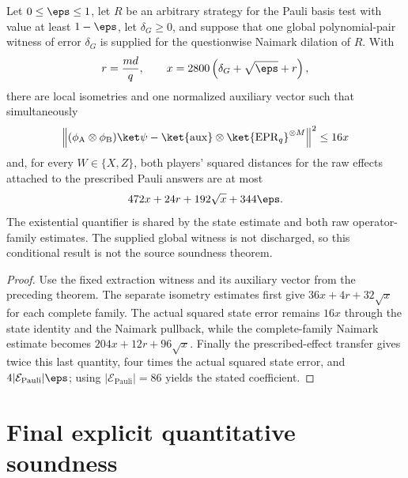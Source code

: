 \begin{theorem}
\label{thm:pauli-supplied-global-component-transfer-explicit}
\leanok
{}
Let $0\leq\eps\leq1$, let $R$ be an arbitrary strategy for the Pauli basis
test with value at least $1-\eps$, let $\delta_G\geq0$, and suppose that one
global polynomial-pair witness of error $\delta_G$ is supplied for the
questionwise Naimark dilation of $R$.  With
\[
 r=\frac{md}{q},
 \qquad
 x=2800\left(\delta_G+\sqrt\eps+r\right),
\]
there are local isometries and one normalized auxiliary vector such that
simultaneously
\[
 \left\|(\phi_{\mathrm A}\otimes\phi_{\mathrm B})\ket\psi
   -\ket{\mathrm{aux}}\otimes\ket{\mathrm{EPR}_q}^{\otimes M}\right\|^2
 \leq16x
\]
and, for every $W\in\{X,Z\}$, both players' squared distances for the raw
effects attached to the prescribed Pauli answers are at most
\[
 472x+24r+192\sqrt{x}+344\eps.
\]
The existential quantifier is shared by the state estimate and both raw
operator-family estimates.  The supplied global witness is not discharged,
so this conditional result is not the source soundness theorem.
\end{theorem}
\begin{proof}
Use the fixed extraction witness and its auxiliary vector from the preceding
theorem.  The separate isometry estimates first give
$36x+4r+32\sqrt{x}$ for each complete family.  The actual squared state error
remains $16x$ through the state identity and the Naimark pullback, while the
complete-family Naimark estimate becomes
$204x+12r+96\sqrt{x}$.  Finally the prescribed-effect transfer gives twice
this last quantity, four times the actual squared state error, and
$4\lvert\mathcal E_{\mathrm{Pauli}}\rvert\eps$; using
$\lvert\mathcal E_{\mathrm{Pauli}}\rvert=86$ yields the stated coefficient.
\end{proof}


\section{Final explicit quantitative soundness}
\label{sec:pauli-final-quantitative-soundness}

